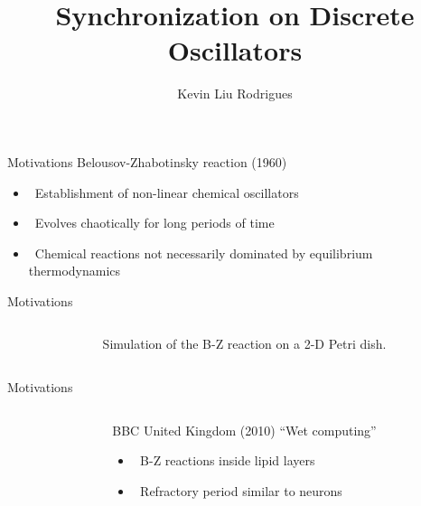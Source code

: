 \documentclass[serif,mathserif]{beamer}
\author[Kevin Liu Rodrigues]{Kevin Liu Rodrigues}
\title[frame \hspace{2em}\insertframenumber/\inserttotalframenumber]{Synchronization on Discrete Oscillators}
\institute{Federal University of Minas Gerais}
\begin{document}
\maketitle

\begin{frame}{Motivations}
    Belousov-Zhabotinsky reaction (1960)
    \begin{itemize}
        \item \ \pause Establishment of non-linear chemical oscillators
        \item \ \pause Evolves chaotically for long periods of time
        \item \ \pause Chemical reactions not necessarily dominated by equilibrium thermodynamics
    \end{itemize}
\end{frame}

\begin{frame}{Motivations}
    \begin{columns}[t]
        \begin{column}{.6\textwidth}
        \end{column}
        \begin{column}{.4\textwidth}
            Simulation of the B-Z reaction on a 2-D Petri dish.
        \end{column}
    \end{columns}
\end{frame}

\begin{frame}{Motivations}
    \begin{columns}[t]
        \begin{column}{0.6\textwidth}
        \end{column}
        \begin{column}{0.4\textwidth}
            BBC United Kingdom (2010) ``Wet computing''
            \begin{itemize}
                \item \ \pause B-Z reactions inside lipid layers
                \item \ \pause Refractory period similar to neurons
            \end{itemize}
        \end{column}
    \end{columns}
\end{frame}
\end{document}

